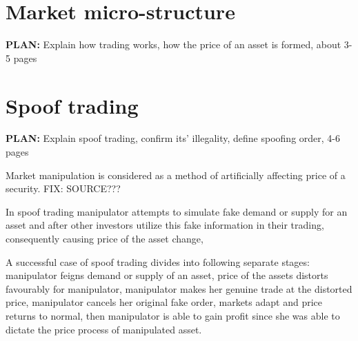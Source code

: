 \documentclass{tut-thesis}
\begin{document}
\section{Market micro-structure}
\textbf{PLAN:} Explain how trading works, how the price of an asset is formed, about 3-5 pages



\section{Spoof trading}
\textbf{PLAN:} Explain spoof trading, confirm its' illegality, define spoofing order, 4-6 pages

Market manipulation is considered as a method of artificially affecting price of a security. FIX: SOURCE???


\autocite{KyleViswanathan2008}

In spoof trading manipulator attempts to simulate fake demand or supply for an asset and after other investors utilize this fake information in their trading, consequently causing price of the asset change, 

A successful case of spoof trading divides into following separate stages: manipulator feigns demand or supply of an asset, price of the assets distorts favourably for manipulator, manipulator makes her genuine trade at the distorted price, manipulator cancels her original fake order, markets adapt and price returns to normal, then manipulator is able to gain profit since she was able to dictate the price process of manipulated asset.
\end{document}
